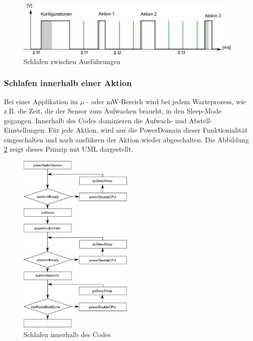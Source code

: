 \begin{figure}[ht]
    \includegraphics[width=\textwidth]{2TheoretischeGrundlagen/imag/SleepGrundprinzip.png}
    \caption{Schlafen zwischen Ausführungen}
    \label{sleep_Grundprinzip} 
\end{figure}

\newpage
\subsubsection{Schlafen innerhalb einer Aktion}
Bei einer Applikation im $\mu$ - oder mW-Bereich wird bei jedem Warteprozess, wie z.B. die Zeit, die der Sensor zum Aufwachen braucht, in den Sleep-Mode gegangen. Innerhalb des Codes dominieren die Aufwach- und Abstell-Einstellungen. Für jede Aktion, wird nur die PowerDomain dieser Funktionialität eingeschalten und nach ausführen der Aktion wieder abgeschalten. Die Abbildung \ref{sleep_intern} zeigt dieses Prinzip mit UML dargestellt.

\begin{figure}[ht]
    \includegraphics[width=0.5\textwidth]{2TheoretischeGrundlagen/imag/SleepInFunktion.png}
    \caption{Schlafen innerhalb des Codes}
    \label{sleep_intern} 
\end{figure}


